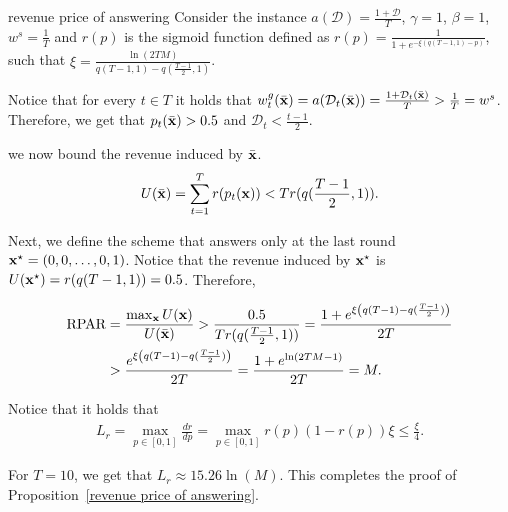 \begin{proofof}{revenue price of answering}
Consider the instance $a(\mathcal{D}) = \frac{1 + \mathcal{D}}{T}$, $\gamma = 1$, $\beta = 1$, $w^s = \frac{1}{T}$ and $r(p)$ is the sigmoid function defined as $r(p) = \frac{1}{1+e^{-\xi \left(q(T-1, 1) - p\right)}}$, such that $\xi = \frac{\ln (2TM)}{q(T-1, 1) - q(\frac{T-1}{2}, 1)}$.

Notice that for every $t \in T$ it holds that
$w^g_t(\Bar{{\bf{x}}}) = a(\mathcal{D}_t(\Bar{{\bf{x}}})) = \frac{1 + \mathcal{D}_t(\Bar{{\bf{x}}})}{T} > \frac{1}{T} = w^s$.
Therefore, we get that $p_t(\Bar{{\bf{x}}}) > 0.5$ and $\mathcal{D}_t < \frac{t-1}{2}$.

we now bound the revenue induced by $\Bar{{\bf{x}}}$.
\begin{align*}
U(\Bar{{\bf{x}}}) = \sum_{t = 1}^T r(p_t({\bf{x}})) < T r(q(\frac{T-1}{2}, 1)).
\end{align*}

Next, we define the scheme that answers only at the last round ${\bf{x}}^\star = (0, 0, \ldots, 0, 1)$.
Notice that the revenue induced by ${\bf{x}}^\star$ is $U({\bf{x}}^\star) = r(q(T-1, 1)) = 0.5$. Therefore,

\begin{align*}
\textnormal{RPAR} &= \frac{\max_{{\bf{x}}} U({\bf{x}})}{U(\Bar{{\bf{x}}})} > \frac{0.5}{T r(q(\frac{T-1}{2}, 1))} = \frac{1+e^{\xi \left(q(T-1) - q(\frac{T-1}{2}) \right)}}{2T} \\
&> \frac{e^{\xi \left(q(T-1) - q(\frac{T-1}{2}) \right)}}{2T} = \frac{1+e^{\ln (2TM - 1)}}{2T} = M.
\end{align*}

Notice that it holds that 
\begin{align*}
L_r = \max_{p \in [0, 1]} \frac{dr}{dp} = \max_{p \in [0, 1]} r(p) (1-r(p)) \xi \leq \frac{\xi}{4}.
\end{align*}

For $T = 10$, we get that $L_r \approx 15.26 \ln(M)$. This completes the proof of Proposition~\ref{revenue price of answering}.
\end{proofof}










